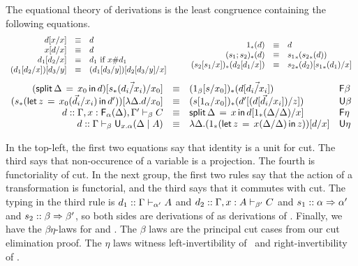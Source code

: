 
The equational theory of derivations is the least congruence containing
the following equations.  
\[
\begin{array}{rcll} 
\Cut{\D}{\Ident{x}}{x} & \deq & \D \\
\Cut{\Ident{x}}{\D}{x} & \deq & \D \\
\Cut{\D_1}{\D_2}{x} & \deq & \D_1 \text{ if $x \# \D_1$}\\
\Cut{(\Cut{\D_1}{\D_2}{x})}{\D_3}{y} & \deq & \Cut{(\Cut{\D_1}{\D_3}{y})}{\Cut{\D_2}{\D_3}{y}}{x}\\
\end{array}
\qquad
\begin{array}{rcll}
\Trd{1}{\D} & \deq & \D\\
\Trd{(s_1;s_2)}{\D} & \deq & \Trd{{s_1}}{\Trd{{s_2}}{\D}} \\
\Trd{(\subst{s_2}{s_1}{x})}{\Cut{\D_2}{\D_1}{x}} & \deq & \Cut{\Trd{{s_2}}{\D_2}}{\Trd{{s_1}}{\D_1}}{x} \\
\end{array}
\]
\[
\begin{array}{rcll}
\Cut{(\FLd{x_0}{\Delta}{\D})}{\FRd{}{s}{\vec{\D_i/x_i}}}{x_0} & \deq & \Trd{(1_\beta[s/x_0])}{\D[\vec{\D_i/x_i}]} & \dsd{F\beta} \\
\Cut{(\ULd{x_0}{}{s}{\vec{\D_i}/x_i}{z}{\D'})}{\URd{\Delta}{\D}}{x_0} & \deq & \Trd{(s[1_{\alpha}/{x_0}])}{\Cut{\D'}{(\D[{\vec{d_i}/x_i}])}{z}} & \dsd{U\beta} \\
\D :: \seq{\Gamma,x:\F{\alpha}{\Delta},\Gamma'}{\beta}{C} & \deq &
\FLd{x}{\Delta}{\Cut{\D}{\FRd{}{1}{\Delta/\Delta}}{x}} & \dsd{F\eta}\\
\D :: \seq{\Gamma}{\beta}{\U{x.\alpha}{\Delta}{A}} & \deq & \URd{\Delta}{\Cut{(\ULd{x}{}{1}{\Delta/\Delta}{z}{z})}{\D}{x}} & \dsd{U\eta}\\
\end{array}
\]

In the top-left, the first two equations say that identity is a unit for
cut.  The third says that non-occurence of a variable is a projection.
The fourth is functoriality of cut.  In the next group, the first two
rules say that the action of a transformation is functorial, and the
third says that it commutes with cut.  The typing in the third rule is
$\D_1 :: \seq{\Gamma}{\alpha'}{A}$ and $\D_2 ::
\seq{\Gamma,x:A}{\beta'}{C}$ and $s_1 :: \alpha \spr \alpha'$ and $s_2
:: \beta \spr \beta'$, so both sides are derivations of as derivations
of .  Finally, we have the
$\beta\eta$-laws for  and .  The $\beta$ laws are the
principal cut cases from our cut elimination proof.  The $\eta$ laws
witness left-invertibility of \Fsymb\, and right-invertibility of
\Usymb.


